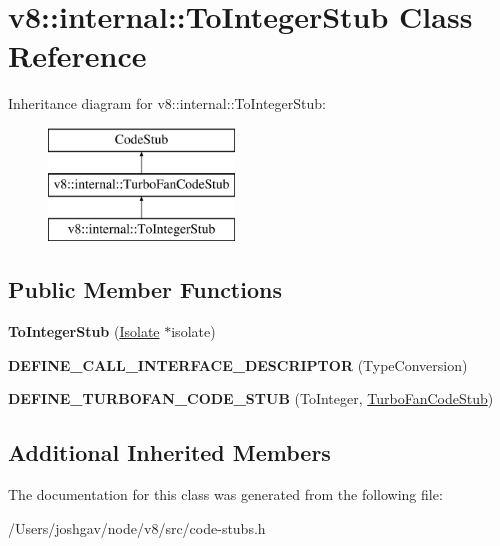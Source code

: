 \hypertarget{classv8_1_1internal_1_1_to_integer_stub}{}\section{v8\+:\+:internal\+:\+:To\+Integer\+Stub Class Reference}
\label{classv8_1_1internal_1_1_to_integer_stub}
Inheritance diagram for v8\+:\+:internal\+:\+:To\+Integer\+Stub\+:\begin{figure}[H]
\begin{center}
\leavevmode
\includegraphics[height=3.000000cm]{classv8_1_1internal_1_1_to_integer_stub}
\end{center}
\end{figure}
\subsection*{Public Member Functions}
\begin{DoxyCompactItemize}
\item 
{\bfseries To\+Integer\+Stub} (\hyperlink{classv8_1_1internal_1_1_isolate}{Isolate} $\ast$isolate)\hypertarget{classv8_1_1internal_1_1_to_integer_stub_a7a2e2be0e3a5e98a3504dff7454fbb9d}{}\label{classv8_1_1internal_1_1_to_integer_stub_a7a2e2be0e3a5e98a3504dff7454fbb9d}

\item 
{\bfseries D\+E\+F\+I\+N\+E\+\_\+\+C\+A\+L\+L\+\_\+\+I\+N\+T\+E\+R\+F\+A\+C\+E\+\_\+\+D\+E\+S\+C\+R\+I\+P\+T\+OR} (Type\+Conversion)\hypertarget{classv8_1_1internal_1_1_to_integer_stub_ab39026b24b8f0b7331d5756098af5a65}{}\label{classv8_1_1internal_1_1_to_integer_stub_ab39026b24b8f0b7331d5756098af5a65}

\item 
{\bfseries D\+E\+F\+I\+N\+E\+\_\+\+T\+U\+R\+B\+O\+F\+A\+N\+\_\+\+C\+O\+D\+E\+\_\+\+S\+T\+UB} (To\+Integer, \hyperlink{classv8_1_1internal_1_1_turbo_fan_code_stub}{Turbo\+Fan\+Code\+Stub})\hypertarget{classv8_1_1internal_1_1_to_integer_stub_a47da0dd7b65e2cbb27295cd9d29e8519}{}\label{classv8_1_1internal_1_1_to_integer_stub_a47da0dd7b65e2cbb27295cd9d29e8519}

\end{DoxyCompactItemize}
\subsection*{Additional Inherited Members}


The documentation for this class was generated from the following file\+:\begin{DoxyCompactItemize}
\item 
/\+Users/joshgav/node/v8/src/code-\/stubs.\+h\end{DoxyCompactItemize}
